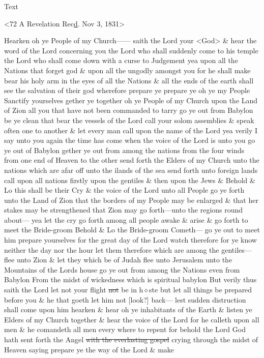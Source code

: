 {				%
			
			\begin{description}
				\item[Text]
			\end{description}
			
				<72 A Revelation Rec\uline{d}. Nov 3, 1831>
				
				Hearken oh ye People of my Church------ saith the Lord your <God> \& hear the word of the Lord concerning you the Lord who shall suddenly come to his temple the Lord who shall come down with a curse to Judgement yea upon all the Nations that forget god \& upon all the ungodly amongst you for he shall make bear his holy arm in the eyes of all the Nations \& all the ends of the earth shall see the salvation of their god wherefore prepare ye prepare ye oh ye my People Sanctify yourselves gether ye together oh ye People of my Church upon the Land of Zion all you that have not been commanded to tarry go ye out from Babylon be ye clean that bear the vessels of the Lord call your solom assemblies \& speak often one to another \& let every man call upon the name of the Lord yea verily I say unto you again the time has come when the voice of the Lord is unto you go ye out of Babylon gether ye out from among the nations from the four winds from one end of Heaven to the other send forth the Elders of my Church unto the nations which are afar off unto the ilands of the sea send forth unto foreign lands call upon all nations firstly upon the gentiles \& then upon the Jews \& Behold \& Lo this shall be their Cry \& the voice of the Lord unto all People go ye forth unto the Land of Zion that the borders of my People may be enlarged \& that her stakes may be strengthened that Zion may go forth---unto the regions round about--- yea let the cry go forth among all people awake \& arise \& go forth to meet the Bride-groom Behold \& Lo the Bride-groom Cometh--- go ye out to meet him prepare yourselves for the great day of the Lord watch therefore for ye know neither the day nor the hour let them therefore which are among the gentiles--- flee unto Zion \& let they which be of Judah flee unto Jerusalem unto the Mountains of the Lords house go ye out from among the Nations even from Babylon From the midst of wickedness which is spiritual babylon But verily thus saith the Lord let not your flight \sout{not} be in h$\diamond$ste but let all things be prepared before you \& he that goeth let him not [look?] back--- lest sudden distruction shall come upon him hearken \& hear oh ye inhabitants of the Earth \& listen ye Elders of my Church together \& hear the voice of the Lord for he calleth upon all men \& he comandeth all men every where to repent for behold the Lord God hath sent forth the Angel \sout{with the everlasting gospel} crying through the midst of Heaven saying prepare ye the way of the Lord \& make }
